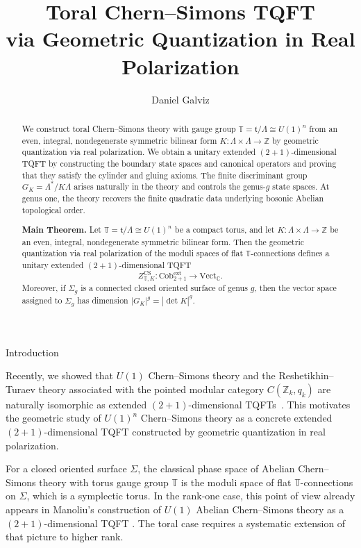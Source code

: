 \documentclass[12pt]{amsart}
\title[Toral Chern--Simons TQFT]{Toral Chern--Simons TQFT\\via Geometric Quantization in Real Polarization}
\author{Daniel Galviz}
\date{}
\makeatletter
\renewcommand\section{\@startsection{section}{1}%
  \z@{.7\linespacing\@plus\linespacing}{.5\linespacing}%
  {\normalfont\bfseries\centering}}
\numberwithin{equation}{section}
\makeatother
\begin{document}
\begin{abstract}
We construct toral Chern--Simons theory with gauge group $\mathbb T=\mathfrak t/\Lambda\cong U(1)^n$ from an even, integral, nondegenerate symmetric bilinear form $K:\Lambda\times\Lambda\to\mathbb Z$ by geometric quantization via real polarization. We obtain a unitary extended $(2+1)$-dimensional TQFT by constructing the boundary state spaces and canonical operators and proving that they satisfy the cylinder and gluing axioms. The finite discriminant group $G_K=\Lambda^*/K\Lambda$ arises naturally in the theory and controls the genus-$g$ state spaces. At genus one, the theory recovers the finite quadratic data underlying bosonic Abelian topological order.
\vspace{0.5cm}
\medskip

\textbf{Main Theorem.}
Let \(\mathbb T=\mathfrak t/\Lambda\cong U(1)^n\) be a compact torus, and let
\(K:\Lambda\times\Lambda\to\mathbb Z\) be an even, integral, nondegenerate symmetric bilinear form.
Then the geometric quantization via real polarization of the moduli spaces of flat \(\mathbb T\)-connections
defines a unitary extended \((2+1)\)-dimensional TQFT
\[
Z^{\mathrm{CS}}_{\mathbb T,K}\colon \mathrm{Cob}^{\mathrm{ext}}_{2+1}\to \mathrm{Vect}_{\mathbb C}.
\]
Moreover, if \(\Sigma_g\) is a connected closed oriented surface of genus \(g\), then the vector space assigned to \(\Sigma_g\) has dimension $|G_K|^g = |\det K|^g.$
\end{abstract}

\maketitle
{\scriptsize
\setlength{\parskip}{0pt}
\hypersetup{linkcolor=black}
\tableofcontents
}

\newpage
\section{Introduction}

Recently, we showed that \(U(1)\) Chern--Simons theory and the Reshetikhin--Turaev theory
associated with the pointed modular category \(C(\mathbb Z_k,q_k)\) are naturally
isomorphic as extended \((2+1)\)-dimensional TQFTs~\cite{Galviz1}. This motivates the
geometric study of \(U(1)^n\) Chern--Simons theory as a concrete extended
\((2+1)\)-dimensional TQFT constructed by geometric quantization in real polarization.

For a closed oriented surface \(\Sigma\), the classical phase space of Abelian
Chern--Simons theory with torus gauge group \(\mathbb T\) is the moduli space of flat
\(\mathbb T\)-connections on \(\Sigma\), which is a symplectic torus. In the rank-one
case, this point of view already appears in Manoliu's construction of  $U(1)$ Abelian
Chern--Simons theory as a \((2+1)\)-dimensional TQFT \cite{Manoliu1,Manoliu2}. The toral
case requires a systematic extension of that picture to higher rank.
\end{document}
